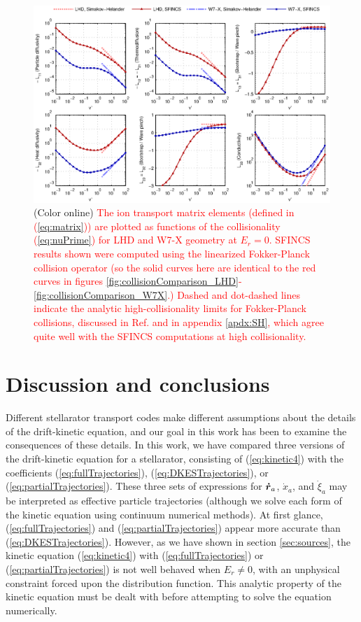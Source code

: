 \documentclass[12pt,superscriptaddress]{revtex4}
\newcommand{\vect}[1]{\mbox{\boldmath $#1$}}
\newcommand{\changed}[1]{\textcolor{red}{#1}}
\begin{document}
\begin{figure}[h!]
\includegraphics{m20140205_02_plotSFINCSVsSimakovHelanderLimitForPaper.eps}
\caption{(Color online)
\changed{
The ion transport matrix elements (defined in (\ref{eq:matrix})) are plotted as functions
of the collisionality (\ref{eq:nuPrime}) for LHD and W7-X geometry at $E_r=0$.
SFINCS results shown were computed using the linearized Fokker-Planck collision operator
(so the solid curves here are
identical to the red curves in figures \ref{fig:collisionComparison_LHD}-\ref{fig:collisionComparison_W7X}.)
Dashed and dot-dashed lines indicate the analytic high-collisionality limits
for Fokker-Planck collisions, discussed in Ref. \cite{AndreiPer2009} and in appendix \ref{apdx:SH},
which agree quite well with the SFINCS computations at high collisionality.
}
\label{fig:SimakovHelanderComparison}}
\end{figure}


\section{Discussion and conclusions}
\label{sec:conclusions}

Different stellarator transport codes make different assumptions about the
details of the drift-kinetic equation, and our goal in this work has been
to examine the consequences of these details.
In this work, we have compared three versions of the drift-kinetic equation
for a stellarator, consisting of (\ref{eq:kinetic4}) with
the coefficients (\ref{eq:fullTrajectories}), (\ref{eq:DKESTrajectories}),
or (\ref{eq:partialTrajectories}).
These three sets of expressions for $\vect{\dot{r}}_a$,
$\dot{x}_a$, and $\dot{\xi}_a$ may be interpreted as effective
particle trajectories (although we solve each form of the kinetic equation
using continuum numerical methods).
At first glance,  (\ref{eq:fullTrajectories}) and  (\ref{eq:partialTrajectories})
appear more accurate than  (\ref{eq:DKESTrajectories}).
However, as we have shown in section \ref{sec:sources},
the kinetic equation (\ref{eq:kinetic4})
with  (\ref{eq:fullTrajectories}) or  (\ref{eq:partialTrajectories})
is not well behaved when $E_r \ne 0$,
with an unphysical constraint forced upon the distribution function.
This analytic property of the kinetic equation must be dealt with
before attempting to solve the equation numerically.
\end{document}
